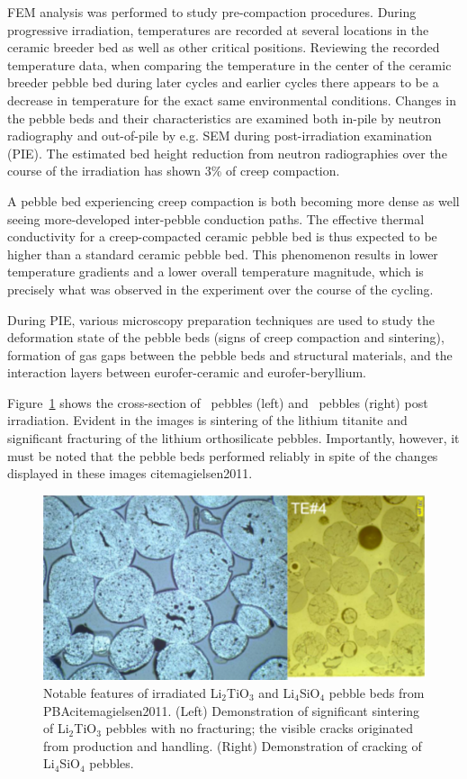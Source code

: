 FEM analysis was performed to study pre-compaction procedures.  During progressive irradiation, temperatures are recorded at several locations in the ceramic breeder bed as well as other critical positions. Reviewing the recorded temperature data, when comparing the temperature in the center of the ceramic breeder pebble bed during later cycles and earlier cycles there appears to be a decrease in temperature for the exact same environmental conditions. Changes in the pebble beds and their characteristics are examined both in-pile by neutron radiography and out-of-pile by e.g. SEM during post-irradiation examination (PIE). The estimated bed height reduction from neutron radiographies over the course of the irradiation has shown 3\% of creep compaction. 

A pebble bed experiencing creep compaction is both becoming more dense as well seeing more-developed inter-pebble conduction paths. The effective thermal conductivity for a creep-compacted ceramic pebble bed is thus expected to be higher than a standard ceramic pebble bed. This phenomenon results in lower temperature gradients and a lower overall temperature magnitude, which is precisely what was observed in the experiment over the course of the cycling. 

During PIE, various microscopy preparation techniques are used to study the deformation state of the pebble beds (signs of creep compaction and sintering), formation of gas gaps between the pebble beds and structural materials, and the interaction layers between eurofer-ceramic and eurofer-beryllium. 

Figure~\ref{fig:pba} shows the cross-section of \lit~pebbles (left) and \lis~pebbles (right) post irradiation. Evident in the images is sintering of the lithium titanite and significant fracturing of the lithium orthosilicate pebbles. Importantly, however, it must be noted that the pebble beds performed reliably in spite of the changes displayed in these images cite{magielsen2011}. 


\begin{figure}[t!]
\centering
\includegraphics[width=\singleimagewidth]{figures/Fig-10}
\caption{Notable features of irradiated Li$_2$TiO$_3$ and Li$_4$SiO$_4$ pebble beds from PBAcite{magielsen2011}. (Left) Demonstration of significant sintering of Li$_2$TiO$_3$ pebbles with no fracturing; the visible cracks originated from production and handling. (Right) Demonstration of cracking of Li$_4$SiO$_4$ pebbles.}
\label{fig:pba}
\end{figure}


